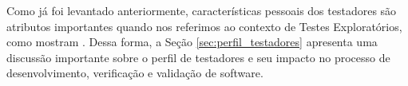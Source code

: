 



Como já foi levantado anteriormente, características pessoais dos testadores são atributos importantes quando nos referimos ao contexto de Testes Exploratórios, como mostram \cite{whittaker2009exploratory, itkonen2015test, itkonen2012role, itkonen2005exploratory}. Dessa forma, a Seção \ref{sec:perfil_testadores} apresenta uma discussão importante sobre o perfil de testadores e seu impacto no processo de desenvolvimento, verificação e validação de software.
